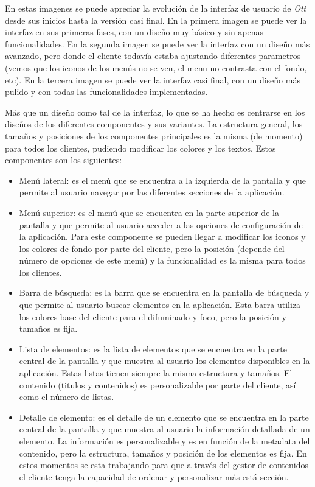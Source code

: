 En estas imagenes se puede apreciar la evolución de la interfaz de usuario de \textit{Ott} desde sus inicios
hasta la versión casi final. En la primera imagen se puede ver la interfaz en sus primeras fases, con un diseño
muy básico y sin apenas funcionalidades. En la segunda imagen se puede ver la interfaz con un diseño más avanzado, 
pero donde el cliente todavía estaba ajustando diferentes parametros (vemos que los iconos de los menús no se ven, 
el menu no contrasta con el fondo, etc). En la tercera imagen se puede ver la interfaz casi final, con un diseño
más pulido y con todas las funcionalidades implementadas.

Más que un diseño como tal de la interfaz, lo que se ha hecho es centrarse en los diseños de los diferentes componentes y sus
variantes. 
La estructura general, los tamaños y posiciones de los componentes principales es la misma (de momento) para todos los clientes, pudiendo
modificar los colores y los textos. Estos componentes son los siguientes:

\begin{itemize}
    \item Menú lateral: es el menú que se encuentra a la izquierda de la pantalla y que permite al usuario navegar por las diferentes secciones de la aplicación.
    \item Menú superior: es el menú que se encuentra en la parte superior de la pantalla y que permite al usuario acceder a las opciones de configuración de la aplicación. 
    Para este componente se pueden llegar a modificar los iconos y los colores de fondo por parte del cliente, pero la posición (depende del número de 
    opciones de este menú) y la funcionalidad es la misma para todos los clientes.
    \item Barra de búsqueda: es la barra que se encuentra en la pantalla de búsqueda y que permite al usuario buscar elementos en la aplicación.
    Esta barra utiliza los colores base del cliente para el difuminado y foco, pero la posición y tamaños es fija. 
    \item Lista de elementos: es la lista de elementos que se encuentra en la parte central de la pantalla y que 
    muestra al usuario los elementos disponibles en la aplicación. Estas listas tienen siempre la misma estructura y tamaños. El contenido
    (titulos y contenidos) es personalizable por parte del cliente, así como el número de listas.
    \item Detalle de elemento: es el detalle de un elemento que se encuentra en la parte central de la pantalla y que muestra al usuario la información detallada de un elemento.
    La información es personalizable y es en función de la metadata del contenido, pero la estructura, tamaños y posición de los elementos es fija. En 
    estos momentos se esta trabajando para que a través del gestor de contenidos el cliente tenga la capacidad de ordenar y personalizar más está 
    sección.
\end{itemize}

